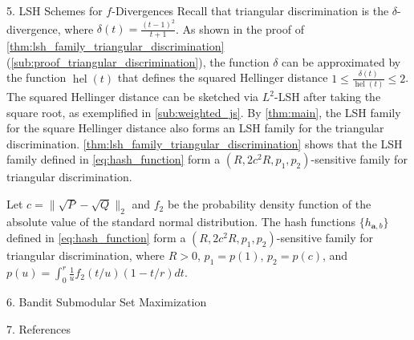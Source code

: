 \documentclass[final]{beamer}
\DeclareMathOperator{\hel}{hel}
\newlength{\onecolwid}
\begin{document}
\begin{frame}[t]
\begin{columns}[t]
\begin{column}{\onecolwid}
\begin{block}{5. LSH Schemes for $ f $-Divergences}
		Recall that  triangular discrimination is the $ \delta $-divergence, 
		where $ 
		\delta(t) = \frac{(t-1)^2}{t+1} $.
		As shown in the proof of 
		\cref{thm:lsh_family_triangular_discrimination} 
		(\cref{sub:proof_triangular_discrimination}), 
		the function $ \delta $ 
		can be 
		approximated by the function $ \hel(t) $ that defines the squared 
		Hellinger 
		distance
		$
		1\le	\frac{\delta(t)}{\hel(t)} \le 2$.
		The squared Hellinger distance can be sketched via $ L^2 $-LSH after 
		taking the 
		square root, as exemplified in \cref{sub:weighted_js}.
		By \cref{thm:main}, the LSH family for the square Hellinger distance 
		also forms 
		an LSH family for the triangular discrimination.
		\cref{thm:lsh_family_triangular_discrimination} shows that the LSH 
		family 
		defined in  \eqref{eq:hash_function} form a 
		$ (R,2c^2R,p_1,p_2) 
		$-sensitive 
		family for 
		triangular discrimination.
		
			Let $ c= \| 
			\sqrt{P}-\sqrt{Q} \|_2$ and $ f_2 $ be the probability density 
			function of 
			the 
			absolute value of the standard normal distribution.	The hash 
			functions $ 
			\{h_{\mathbf{a},b}\}  $ defined in \eqref{eq:hash_function} form a 
			$ (R,2c^2R,p_1,p_2) 
			$-sensitive 
			family for 
			triangular discrimination, where $ R>0 
			$, $ p_1 = p(1) $, $ p_2=p(c) $, and $
			p(u) = \int_0^r \frac{1}{u}f_2(t/u)(1-t/r)dt$.
		
	\end{block}
	

	
	\begin{block}{6. Bandit Submodular Set Maximization}
 	
	\end{block}
	
	\begin{block}{7. References}
		
		
	\end{block}
	
\end{column} %
 
		
	\end{columns} %
	
\end{frame} %
\end{document}
